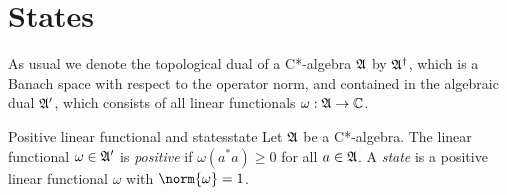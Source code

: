 \section{States}
As usual we denote the topological dual of a C*-algebra \(\mathfrak{A}\) by \(\mathfrak{A}^\dag\), which is a Banach space with respect to the operator norm, and contained in the algebraic dual \(\mathfrak{A}'\), which consists of all linear functionals \(\omega : \mathfrak{A} \to \mathbb{C}\).
\begin{definition}{Positive linear functional and states}{state}
    Let \(\mathfrak{A}\) be a C*-algebra. The linear functional \(\omega \in \mathfrak{A}'\) is \emph{positive} if \(\omega(a^*a) \geq 0\) for all \(a \in \mathfrak{A}\). A \emph{state} is a positive linear functional \(\omega\) with \(\norm{\omega} = 1\).
\end{definition}

